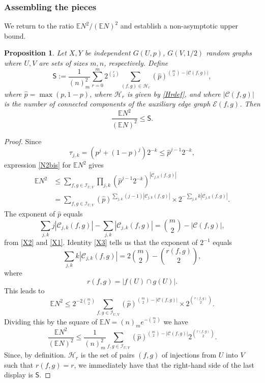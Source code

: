 \documentclass[reqno]{amsart}
\theoremstyle{theorem}
\newtheorem{proposition}[theorem]{Proposition}
\theoremstyle{definition}
\theoremstyle{remark}
\def\E{\mathbb{E}}
\def\CC{\mathscr{C}}
\def\EE{\mathscr{E}}
\def\HH{\mathscr{H}}
\newcommand{\1}{{\text{\Large $\mathfrak 1$}}}	%
\renewcommand{\limsup}{\varlimsup}
\numberwithin{equation}{section}
\def\II{\mathscr I}
\def\pmax{{\widehat p}}
\def\SSS{\mathsf S}
\begin{document}
\subsubsection{\bfseries Assembling the pieces}
\label{SSSsubsec}
We return to the ratio $\E N^2/(\E N)^2$ and establish a 
non-asymptotic upper bound.
\begin{proposition}
\label{esoteric}
Let $X, Y$ be independent $G(U,p)$, $G(V,1/2)$ random graphs
where $U, V$ are sets of sizes $m,n$, respectively.
Define
\begin{equation}
\label{SSS}
\SSS := \frac{1}{(n)_m^2} \sum_{r=0}^m 
2^{\binom{r}{2}} \sum_{(f,g) \in \HH_r} (\pmax)^{\binom{m}{2}-|\CC(f,g)|},
\end{equation}
where $\widehat p = \max(p,1-p)$, where $\HH_r$ is given by \eqref{Hrdef},
and where $|\CC(f,g)|$ is the number of connected components of
the auxiliary edge graph $\EE(f,g)$.
Then
\[
\frac{\E N^2}{(\E N)^2} \le \SSS.
\]
\end{proposition}
\begin{proof}
Since
\[
\tau_{j,k} = (p^j+(1-p)^j) 2^{-k} \le \pmax^{j-1} 2^{-k},
\]
expression \eqref{N2bis} for $\E N^2$ gives
\begin{align*}
\E N^2 &\le \sum_{f,g \in \II_{U,V}} \prod_{j,k}
\left(\pmax^{j-1} 2^{-k}\right)^{|\CC_{j,k}(f,g)|}
\\
&= \sum_{f,g \in \II_{U,V}} 
(\pmax)^{\sum_{j,k} (j-1) |\CC_{j,k}(f,g)|}
\times 2^{-\sum_{j,k} k |\CC_{j,k}(f,g)|}.
\end{align*}
The exponent of $\pmax$ equals
\[
\sum_{j,k} j |\CC_{j,k}(f,g)|  - \sum_{j,k} |\CC_{j,k}(f,g)| 
= \binom{m}{2} - |\CC(f,g)|,
\]
from \eqref{X2} and \eqref{X1}.
Identity \eqref{X3} tells us that the exponent of $2^{-1}$ equals
\[
\sum_{j,k} k |\CC_{j,k}(f,g)| = 2 \binom{m}{2} - \binom{r(f,g)}{2},
\]
where 
\[
r(f,g) = |f(U)\cap g(U)|.
\]
This leads to
\begin{equation*}
\E N^2  \le
2^{-2\binom{m}{2}}
\sum_{f,g \in \II_{U,V}}                                                          
(\pmax)^{\binom{m}{2}-|\CC(f,g)|} \times 2^{\binom{r(f,g)}{2}}.
\end{equation*}
Dividing this by the square of $\E N = (n)_m e^{-\binom{m}{2}}$ we have 
\[
\frac{\E N^2}{(\E N)^2} \le
\frac{1}{(n)_m^2} \sum_{f,g \in \II_{U,V}} 
(\pmax)^{\binom{m}{2}-|\CC(f,g)|} 2^{\binom{r(f,g)}{2}}.
\]
Since, by definition. $\HH_r$ is the set of pairs $(f,g)$
of injections from $U$ into $V$ such that $r(f,g)=r$,
we immediately have that the right-hand side of the last display is
$\SSS$.
\end{proof}
\end{document}
